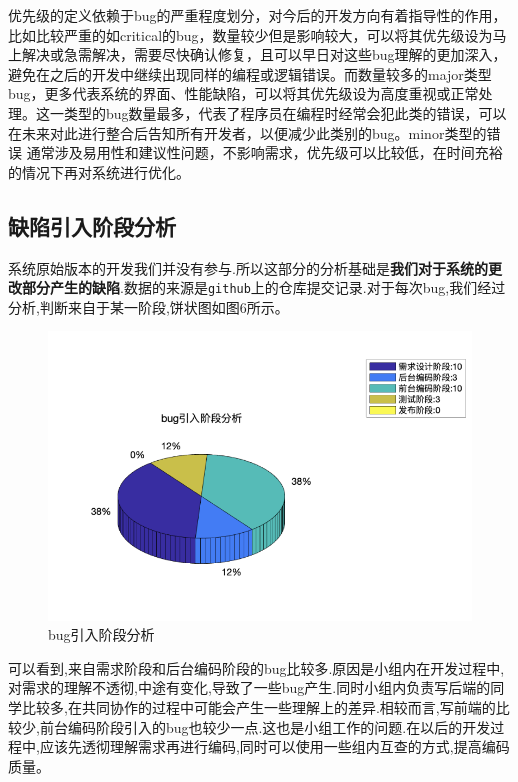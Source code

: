 \documentclass[hyperref, a4paper]{ctexart}
\begin{document}
优先级的定义依赖于bug的严重程度划分，对今后的开发方向有着指导性的作用，比如比较严重的如critical的bug，数量较少但是影响较大，可以将其优先级设为马上解决或急需解决，需要尽快确认修复，且可以早日对这些bug理解的更加深入，避免在之后的开发中继续出现同样的编程或逻辑错误。而数量较多的major类型bug，更多代表系统的界面、性能缺陷，可以将其优先级设为高度重视或正常处理。这一类型的bug数量最多，代表了程序员在编程时经常会犯此类的错误，可以在未来对此进行整合后告知所有开发者，以便减少此类别的bug。minor类型的错误
通常涉及易用性和建议性问题，不影响需求，优先级可以比较低，在时间充裕的情况下再对系统进行优化。

\hypertarget{ux7f3aux9677ux5f15ux5165ux9636ux6bb5ux5206ux6790}{%
\subsection{缺陷引入阶段分析}\label{ux7f3aux9677ux5f15ux5165ux9636ux6bb5ux5206ux6790}}

系统原始版本的开发我们并没有参与.所以这部分的分析基础是\textbf{我们对于系统的更改部分产生的缺陷}.数据的来源是\texttt{github}上的仓库提交记录.对于每次bug,我们经过分析,判断来自于某一阶段,饼状图如图6所示。

\begin{figure}
\centering
\includegraphics{pic/WechatIMG19621.png}
\caption{bug引入阶段分析}
\end{figure}

可以看到,来自需求阶段和后台编码阶段的bug比较多.原因是小组内在开发过程中,对需求的理解不透彻,中途有变化,导致了一些bug产生.同时小组内负责写后端的同学比较多,在共同协作的过程中可能会产生一些理解上的差异.相较而言,写前端的比较少,前台编码阶段引入的bug也较少一点.这也是小组工作的问题.在以后的开发过程中,应该先透彻理解需求再进行编码,同时可以使用一些组内互查的方式,提高编码质量。
\end{document}
